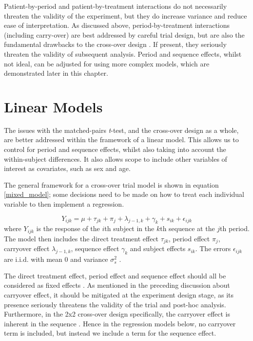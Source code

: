 \documentclass[12pt, TexShade, letterpaper]{report}
\begin{document}
Patient-by-period and patient-by-treatment interactions do not necessarily threaten the validity of the experiment, but they do increase variance and reduce ease of interpretation. As discussed above, period-by-treatment interactions (including carry-over) are best addressed by careful trial design, but are also the fundamental drawbacks to the cross-over design \cite{senn2002crossover}. If present, they seriously threaten the validity of subsequent analysis. Period and sequence effects, whilst not ideal, can be adjusted for using more complex models, which are demonstrated later in this chapter.

\section{Linear Models}
The issues with the matched-pairs \textit{t}-test, and the cross-over design as a whole, are better addressed within the framework of a linear model. This allows us to control for period and sequence effects, whilst also taking into account the within-subject differences. It also allows scope to include other variables of interest as covariates, such as sex and age.

The general framework for a cross-over trial model is shown in equation \ref{mixed_model}; some decisions need to be made on how to treat each individual variable to then implement a regression.

\begin{equation}
    Y_{ijk} = \mu + \tau_{jk} + \pi_j + \lambda_{j-1,k} + \gamma_k + s_{ik} + \epsilon_{ijk}
    \label{mixed_model}
\end{equation}
where $Y_{ijk}$ is the response of the $i$th subject in the $k$th sequence at the $j$th period. The model then includes the direct treatment effect $\tau_{jk}$, period effect $\pi_j$, carryover effect $\lambda_{j-1,k}$, sequence effect $\gamma_k$ and subject effects $s_{ik}$. The errors $\epsilon_{ijk}$ are i.i.d. with mean 0 and variance $\sigma^2_s$ \cite{lim2021considerations}.

The direct treatment effect, period effect and sequence effect should all be considered as fixed effects \cite{lim2021considerations}. As mentioned in the preceding discussion about carryover effect, it should be mitigated at the experiment design stage, as its presence seriously threatens the validity of the trial and post-hoc analysis. Furthermore, in the 2x2 cross-over design specifically, the carryover effect is inherent in the sequence \cite{lim2021considerations}. Hence in the regression models below, no carryover term is included, but instead we include a term for the sequence effect.
\end{document}
